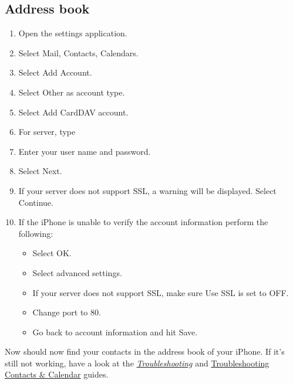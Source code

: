 \documentclass[letterpaper,10pt,english]{sphinxmanual}
\begin{document}
\subsection{Address book}
\label{pim/sync_ios:address-book}\begin{enumerate}
\item {} 
Open the settings application.

\item {} 
Select Mail, Contacts, Calendars.

\item {} 
Select Add Account.

\item {} 
Select Other as account type.

\item {} 
Select Add CardDAV account.

\item {} 
For server, type 

\item {} 
Enter your user name and password.

\item {} 
Select Next.

\item {} 
If your server does not support SSL, a warning will be displayed.
Select Continue.

\item {} 
If the iPhone is unable to verify the account information perform the
following:
\begin{itemize}
\item {} 
Select OK.

\item {} 
Select advanced settings.

\item {} 
If your server does not support SSL, make sure Use SSL is set to OFF.

\item {} 
Change port to 80.

\item {} 
Go back to account information and hit Save.

\end{itemize}

\end{enumerate}

Now should now find your contacts in the address book of your iPhone.
If it's still not working, have a look at the {\hyperref[pim/troubleshooting::doc]{\emph{\emph{Troubleshooting}}}}
and \href{https://doc.owncloud.org/server/9.0/admin\_manual/issues/index.html\#troubleshooting-contacts-calendar}{Troubleshooting Contacts \& Calendar} guides.
\end{document}
